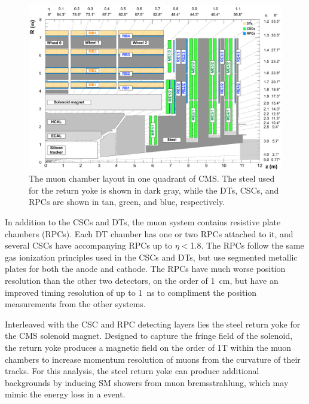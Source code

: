 \begin{figure}[ht]
    \includegraphics[width=\textwidth]{figures/cms_quadrant_run_ii.pdf}
    \centering
    \caption[Muon chamber layout in Run 2]{The muon chamber layout in one quadrant of CMS. The steel used for the return yoke is shown in dark gray, while the DTs, CSCs, and RPCs are shown in tan, green, and blue, respectively.}
    \label{fig:cscLayout}
\end{figure}

In addition to the CSCs and DTs, the muon system contains resistive plate chambers (RPCs). 
Each DT chamber has one or two RPCs attached to it, and several CSCs have accompanying RPCs up to $\eta<$1.8. 
The RPCs follow the same gas ionization principles used in the CSCs and DTs, but use segmented metallic plates for both the anode and cathode.
The RPCs have much worse position resolution than the other two detectors, on the order of \SI{1}{\centi\meter}, but have an improved timing resolution of up to \SI{1}{\nano\second} to compliment the position measurements from the other systems.

Interleaved with the CSC and RPC detecting layers lies the steel return yoke for the CMS solenoid magnet.
Designed to capture the fringe field of the solenoid, the return yoke produces a magnetic field on the order of 1T within the muon chambers to increase momentum resolution of muons from the curvature of their tracks.
For this analysis, the steel return yoke can produce additional backgrounds by inducing SM showers from muon bremsstrahlung, which may mimic the energy loss in a \dbrem event.

